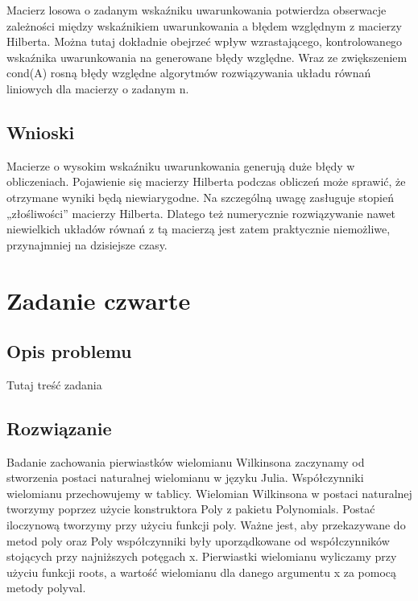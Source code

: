 \documentclass[8pt,letterpaper]{article}
\begin{document}
\hspace{1.0 cm} Macierz losowa o zadanym wskaźniku uwarunkowania potwierdza obserwacje zależności między wskaźnikiem uwarunkowania a błędem względnym z macierzy Hilberta. Można tutaj dokładnie obejrzeć wpływ wzrastającego, kontrolowanego wskaźnika uwarunkowania na generowane błędy względne. Wraz ze zwiększeniem cond(A) rosną błędy względne algorytmów rozwiązywania układu równań liniowych dla macierzy o zadanym n.

\subsection{Wnioski}

\hspace{1.0 cm} Macierze o wysokim wskaźniku uwarunkowania generują duże błędy w obliczeniach. Pojawienie się macierzy Hilberta podczas obliczeń może sprawić, że otrzymane wyniki będą niewiarygodne. Na szczególną uwagę zasługuje stopień „złośliwości” macierzy Hilberta. Dlatego też numerycznie rozwiązywanie nawet niewielkich układów równań z tą macierzą jest zatem praktycznie niemożliwe, przynajmniej na dzisiejsze czasy.




\section{Zadanie czwarte}
  
\subsection{Opis problemu}

\hspace{1.0 cm} Tutaj treść zadania
 
\subsection{Rozwiązanie}
\hspace{1.0 cm}Badanie zachowania pierwiastków wielomianu Wilkinsona zaczynamy od stworzenia postaci naturalnej wielomianu w języku Julia. Współczynniki wielomianu przechowujemy w tablicy. Wielomian Wilkinsona w postaci naturalnej tworzymy poprzez użycie konstruktora Poly z pakietu Polynomials. Postać iloczynową tworzymy przy użyciu funkcji poly. Ważne jest, aby przekazywane do metod poly oraz Poly współczynniki były uporządkowane od współczynników stojących przy najniższych potęgach x. Pierwiastki wielomianu wyliczamy przy użyciu funkcji roots, a wartość wielomianu dla danego argumentu x za pomocą metody polyval.
\end{document}
